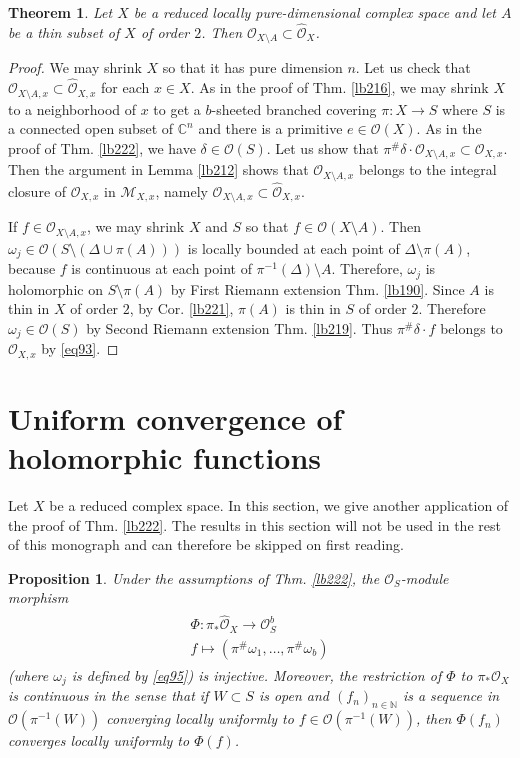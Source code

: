 \documentclass[12pt,b5paper,notitlepage]{report}
\theoremstyle{definition}
\theoremstyle{plain}
\newtheorem{thm}[df]{Theorem}
\newtheorem{pp}[df]{Proposition}
\newcommand{\wht}{\widehat}
\newcommand{\scr}{\mathscr}
\newcommand{\Cbb}{\mathbb C}
\newcommand{\Nbb}{\mathbb N}
\newcommand{\Owht}{\widehat{\scr O}}
\numberwithin{equation}{section}
\begin{document}
\begin{thm}\label{lb235}
Let $X$ be a reduced locally pure-dimensional complex space and let $A$ be a thin subset of $X$ of order $2$. Then $\scr O_{X\setminus A}\subset\Owht_X$.
\end{thm}


\begin{proof}
We may shrink $X$ so that it has pure dimension $n$. Let us check that $\scr O_{X\setminus A,x}\subset\Owht_{X,x}$ for each $x\in X$. As in the proof of Thm. \ref{lb216}, we may shrink $X$ to a neighborhood of $x$ to get a $b$-sheeted branched covering $\pi:X\rightarrow S$ where $S$ is a connected open subset of $\Cbb^n$ and there is a primitive $e\in\scr O(X)$. As in the proof of Thm. \ref{lb222}, we have $\delta\in\scr O(S)$. Let us show that $\pi^\#\delta\cdot\scr O_{X\setminus A,x}\subset\scr O_{X,x}$. Then the argument in Lemma \ref{lb212} shows that $\scr O_{X\setminus A,x}$ belongs to the integral closure of $\scr O_{X,x}$ in $\scr M_{X,x}$, namely $\scr O_{X\setminus A,x}\subset\Owht_{X,x}$.

If $f\in\scr O_{X\setminus A,x}$, we may shrink $X$ and $S$ so that $f\in\scr O(X\setminus A)$. Then $\omega_j\in\scr O(S\setminus(\Delta\cup\pi(A)))$ is locally bounded at each point of $\Delta\setminus\pi(A)$, because $f$ is continuous at each point of $\pi^{-1}(\Delta)\setminus A$. Therefore, $\omega_j$ is holomorphic on $S\setminus \pi(A)$ by First Riemann extension Thm. \ref{lb190}. Since $A$ is thin in $X$ of order $2$, by Cor. \ref{lb221}, $\pi(A)$ is thin in $S$ of order $2$. Therefore $\omega_j\in\scr O(S)$ by Second Riemann extension Thm. \ref{lb219}. Thus $\pi^\#\delta\cdot f$ belongs to $\scr O_{X,x}$ by \eqref{eq93}.
\end{proof}




\section{Uniform convergence of holomorphic functions}

Let $X$ be a reduced complex space. In this section, we give another application of the proof of Thm. \ref{lb222}. The results in this section will not be used in the rest of this monograph and can therefore be skipped on first reading.


\begin{pp}\label{lb365}
Under the assumptions of Thm. \ref{lb222}, the $\scr O_S$-module morphism
\begin{gather}
\begin{gathered}
\Phi:\pi_*\wht{\scr O}_X\rightarrow \scr O_S^b\\
f\mapsto (\pi^\#\omega_1,\dots,\pi^\#\omega_b)
\end{gathered}
\end{gather}
(where $\omega_j$ is defined by \eqref{eq95}) is injective. Moreover, the restriction of $\Phi$ to $\pi_*\scr O_X$ is continuous in the sense that if $W\subset S$ is open and $(f_n)_{n\in\Nbb}$ is a sequence in $\scr O(\pi^{-1}(W))$ converging locally uniformly to $f\in \scr O(\pi^{-1}(W))$, then $\Phi(f_n)$ converges locally uniformly to $\Phi(f)$.
\end{pp}
\end{document}
